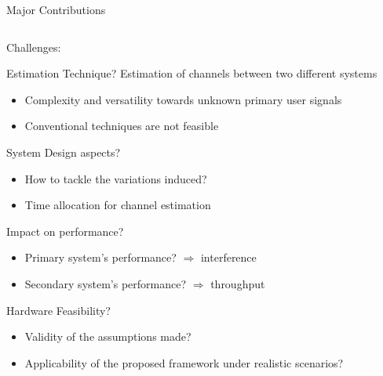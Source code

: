 \documentclass[16pt]{beamer}
\newcommand{\fs}[2]{\fontsize{#1 pt}{#2}\selectfont}
\begin{document}
\begin{frame}[t]{Major Contributions}
	\vspace{-1.5mm}
	\begin{columns}
		\begin{column}[t]{0.53\columnwidth}
			\centering Challenges: \\[-0.2em]
				\fs{7}{8}
				\begin{block}{\scriptsize Estimation Technique?} %
					Estimation of channels between two different systems %
					\begin{itemize}
						\item Complexity and versatility towards unknown primary user signals
						\item Conventional techniques are not feasible  
					\end{itemize}
				\end{block}
				\vspace{-1.1mm}
				{
				\begin{block}{\scriptsize System Design aspects?} %
					\begin{itemize} 
						\item How to tackle the variations induced? 
						\item Time allocation for channel estimation 
					\end{itemize}
				\end{block}
				}
				\vspace{-1.1mm}
				{
				\begin{block}{\scriptsize Impact on performance?}%
					\begin{itemize}
						\item Primary system's performance? $\Rightarrow$ interference 
						\item Secondary system's performance? $\Rightarrow$ throughput 
					\end{itemize} 
				\end{block}
				}	
				\vspace{-1.1mm}
				{
				\begin{block}{\scriptsize Hardware Feasibility?}%
					\begin{itemize}
					\item Validity of the assumptions made? 
					\item Applicability of the proposed framework under realistic scenarios? 
					\end{itemize}	
				\end{block}
				}
		\end{column}
		

\end{columns}
\end{frame}
\end{document}
